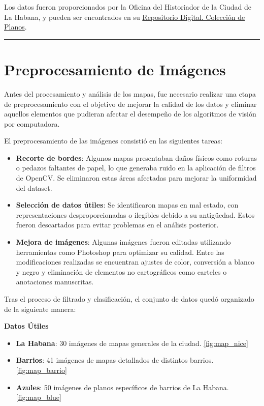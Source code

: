 \documentclass[twocolumn, fontsize=10pt]{article}
\begin{document}
Los datos fueron proporcionados por la Oficina del Historiador de la Ciudad de La Habana, y pueden ser encontrados en su \href{https://repositoriodigital.ohc.cu/s/repositoriodigital/item-set/73018}{Repositorio Digital. Colección de Planos}.

\rule{\linewidth}{0.5pt}
\section{Preprocesamiento de Imágenes}


Antes del procesamiento y análisis de los mapas, fue necesario realizar una etapa de preprocesamiento con el objetivo de mejorar la calidad de los datos y eliminar aquellos elementos que pudieran afectar el desempeño de los algoritmos de visión por computadora.

El preprocesamiento de las imágenes consistió en las siguientes tareas:

\begin{itemize}
    \item \textbf{Recorte de bordes}: Algunos mapas presentaban daños físicos como roturas o pedazos faltantes de papel, lo que generaba ruido en la aplicación de filtros de OpenCV. Se eliminaron estas áreas afectadas para mejorar la uniformidad del dataset.
    \item \textbf{Selección de datos útiles}: Se identificaron mapas en mal estado, con representaciones desproporcionadas o ilegibles debido a su antigüedad. Estos fueron descartados para evitar problemas en el análisis posterior.
    \item \textbf{Mejora de imágenes}: Algunas imágenes fueron editadas utilizando herramientas como Photoshop para optimizar su calidad. Entre las modificaciones realizadas se encuentran ajustes de color, conversión a blanco y negro y eliminación de elementos no cartográficos como carteles o anotaciones manuscritas.
\end{itemize}

Tras el proceso de filtrado y clasificación, el conjunto de datos quedó organizado de la siguiente manera:


\textbf{Datos Útiles}
\begin{itemize}
    \item \textbf{La Habana}: 30 imágenes de mapas generales de la ciudad. \ref{fig:map_nice}
    \item \textbf{Barrios}: 41 imágenes de mapas detallados de distintos barrios. \ref{fig:map_barrio}
    \item \textbf{Azules}: 50 imágenes de planos específicos de barrios de La Habana. \ref{fig:map_blue}
\end{itemize}
\end{document}
